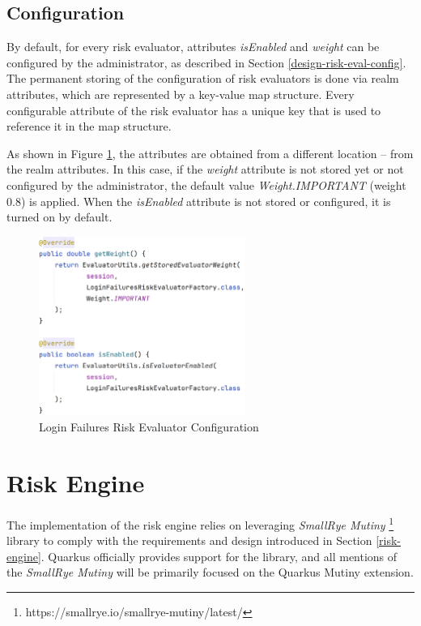\newpage
\subsection{Configuration}
By default, for every risk evaluator, attributes \textit{isEnabled} and \textit{weight} can be configured by the administrator, as described in Section \ref{design-risk-eval-config}.
The permanent storing of the configuration of risk evaluators is done via realm attributes, which are represented by a key-value map structure.
Every configurable attribute of the risk evaluator has a unique key that is used to reference it in the map structure.

As shown in Figure \ref{fig:impl-risk-evaluator-login-failures-config}, the attributes are obtained from a different location -- from the realm attributes.
In this case, if the \textit{weight} attribute is not stored yet or not configured by the administrator, the default value \textit{Weight.IMPORTANT} (weight 0.8) is applied.
When the \textit{isEnabled} attribute is not stored or configured, it is turned on by default.

\begin{figure}[htbp]
  \centering
  \includegraphics[width=0.6\textwidth]{img/sections/6-implementation/loginFailuresConfig.png}
  \caption{Login Failures Risk Evaluator Configuration}
  \label{fig:impl-risk-evaluator-login-failures-config}
\end{figure}

\newpage
\section{Risk Engine}

The implementation of the risk engine relies on leveraging \textit{SmallRye Mutiny}
\footnote{https://smallrye.io/smallrye-mutiny/latest/} library to comply with the requirements and design introduced in Section \ref{risk-engine}.
Quarkus officially provides support for the library, and all mentions of the \textit{SmallRye Mutiny} will be primarily focused on the Quarkus Mutiny extension.

